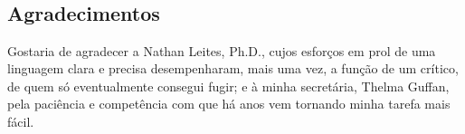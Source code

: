 
\begin{comment}
KARNAC --- London/New York {}- PERVERSÃO, A forma Erótica do Ódio -
Robert J. Stoller, M.D.

[Publicado pela primeira vez em 1975 --- Reimpresso em 1986 com
autorização da Pantheon Books, New York, por H. Karnac (Books) Ltd. 6
Pembroke Buildings London NW10 6RE Publicado pela terceira vez em 2003
©1986

\{Todos os direitos reservados. Nenhuma parte desta publicação pode ser
reproduzida, armazenada em sistema de recuperação de dados nem
transmitida, sob qualquer forma ou meio, eletrônico, mecânico,
fotocópia, gravação, ou seja de que modo for, sem o prévio
consentimento, por escrito, do editor.\}

British Library Cataloguing in Publication Data

Uma C.I.P. para este livro pode ser obtida da British Library

ISBN: 0 946439 20 6

www.karnacbooks.com]
\end{comment}

\newcommand\imagem[2][0]{%
  \begin{figure}[p]
    \vspace*{-20.4mm}\hspace*{\dimexpr-28mm + #1mm}%
    \noindent\texttt{[image: img/\#2]}
  \end{figure}}

\cleardoublepage



\chapter*{\ }

\section*{Agradecimentos}
\thispagestyle{empty}

Gostaria de agradecer a Nathan Leites, Ph.D., cujos esforços em prol de
uma linguagem clara e precisa desempenharam, mais uma vez, a função de
um crítico, de quem só eventualmente consegui fugir; e à minha
secretária, Thelma Guffan, pela paciência e competência com que há anos
vem tornando minha tarefa mais fácil.



